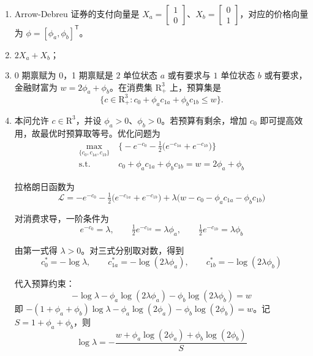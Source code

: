 \begin{solution}[blank-type=manual,blank-vsep=9\baselineskip]
\begin{enumerate}[label=(\alph*)]
    \item Arrow-Debreu 证券的支付向量是 $X_{a}=\begin{bmatrix}1 \\ 0\end{bmatrix}$、$X_{b}=\begin{bmatrix}0 \\ 1\end{bmatrix}$，对应的价格向量为 $\phi=[\phi_a,\phi_b]^{\mathsf T}$。
    \item $2X_{a}+X_{b}$；
    \item 0 期禀赋为 $0$，1 期禀赋是 $2$ 单位状态 $a$ 或有要求与 $1$ 单位状态 $b$ 或有要求，金融财富为 $w=2\phi_{a}+\phi_{b}$。在消费集 $\mathrm{R}_{+}^{3}$ 上，预算集是
    \[
        \bigl\{c\in\mathrm{R}_{+}^{3}:c_{0}+\phi_{a}c_{1a}+\phi_{b}c_{1b}\le w\bigr\}.
    \]
    \item 本问允许 $c\in\mathrm{R}^3$，并设 $\phi_a>0$、$\phi_b>0$。若预算有剩余，增加 $c_0$ 即可提高效用，故最优时预算取等号。优化问题为
    \[
        \begin{aligned}
            \max_{\{c_{0},c_{1a},c_{1b}\}}\ &\bigl\{-e^{-c_{0}}-\tfrac12\bigl(e^{-c_{1a}}+e^{-c_{1b}}\bigr)\bigr\}\\
            \mathrm{s.t.}\quad &c_{0}+\phi_{a}c_{1a}+\phi_{b}c_{1b}=w=2\phi_{a}+\phi_{b}
        \end{aligned}
    \]

    拉格朗日函数为
    \[
        \mathcal{L}=-e^{-c_{0}}-\tfrac12\bigl(e^{-c_{1a}}+e^{-c_{1b}}\bigr)+\lambda\bigl(w-c_{0}-\phi_{a}c_{1a}-\phi_{b}c_{1b}\bigr)
    \]

    对消费求导，一阶条件为
    \[
        e^{-c_{0}}=\lambda,\qquad
        \tfrac12 e^{-c_{1a}}=\lambda\phi_{a},\qquad
        \tfrac12 e^{-c_{1b}}=\lambda\phi_{b}
    \]

    由第一式得 $\lambda>0$。对三式分别取对数，得到
    \[
        c_{0}^{*}=-\log\lambda,\qquad
        c_{1a}^{*}=-\log(2\lambda\phi_{a}),\qquad
        c_{1b}^{*}=-\log(2\lambda\phi_{b})
    \]

    代入预算约束：
    \[
        -\log\lambda-\phi_{a}\log(2\lambda\phi_{a})-\phi_{b}\log(2\lambda\phi_{b})=w
    \]
    即 $-(1+\phi_{a}+\phi_{b})\log\lambda-\phi_{a}\log(2\phi_{a})-\phi_{b}\log(2\phi_{b})=w$。记 $S=1+\phi_{a}+\phi_{b}$，则
    \[
        \log\lambda=-\frac{w+\phi_{a}\log(2\phi_{a})+\phi_{b}\log(2\phi_{b})}{S}
    \]


\end{enumerate}
\end{solution}
